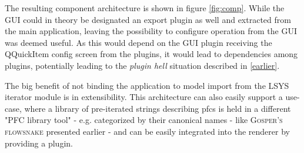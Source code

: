 The resulting component architecture is shown in figure \ref{fig:comp}. While the GUI could in theory be designated an export plugin as well and extracted from the main application, leaving the possibility to configure operation from the GUI was deemed useful. As this would depend on the GUI plugin receiving the QQuickItem config screen from the plugins, it would lead to dependencies among plugins, potentially leading to the \textit{plugin hell} situation described in \ref{earlier}.

The big benefit of not binding the application to model import from the LSYS iterator module is in extensibility. This architecture can also easily support a use-case, where a library of pre-iterated strings describing \gls{pfc}s is held in a different "PFC library tool" - e.g. categorized by their canonical names - like \textsc{Gosper's flowsnake} presented earlier - and can be easily integrated into the renderer by providing a plugin.
